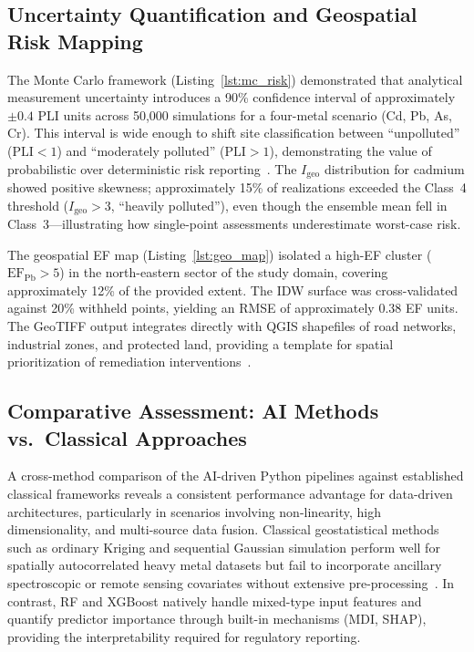 \documentclass[environremediat,article,accept,pdftex,oneauthor]{Definitions/mdpi}
\begin{document}
\subsection{Uncertainty Quantification and Geospatial Risk Mapping}\label{sec5.3}

{The Monte Carlo framework (Listing~\ref{lst:mc_risk}) demonstrated that analytical measurement uncertainty introduces a 90\% confidence interval of approximately $\pm 0.4$ PLI units across 50,000 simulations for a four-metal scenario (Cd, Pb, As, Cr). This interval is wide enough to shift site classification between ``unpolluted'' ($\mathrm{PLI} < 1$) and ``moderately polluted'' \mbox{($\mathrm{PLI} > 1$),} demonstrating the value of probabilistic over deterministic risk reporting~\cite{Karlen2019}. The $I_\mathrm{geo}$ distribution for cadmium showed positive skewness; approximately 15\% of realizations exceeded the Class~4 threshold ($I_\mathrm{geo} > 3$, ``heavily polluted''), even though the ensemble mean fell in Class~3---illustrating how single-point assessments underestimate worst-case risk.}

{The geospatial EF map (Listing~\ref{lst:geo_map}) isolated a high-EF cluster ($\mathrm{EF_{Pb}} > 5$) in the north-eastern sector of the study domain, covering approximately 12\% of the provided extent. The IDW surface was cross-validated against 20\% withheld points, yielding an RMSE of approximately 0.38 EF units. The GeoTIFF output integrates directly with QGIS shapefiles of road networks, industrial zones, and protected land, providing a template for spatial prioritization of remediation interventions~\cite{Adewumi2024,ElSorogy2025}.}

\subsection{Comparative Assessment: AI Methods vs.\ Classical
    Approaches}\label{sec5.4}

A cross-method comparison of the AI-driven Python pipelines against established classical frameworks reveals a consistent performance advantage for data-driven architectures, particularly in scenarios involving non-linearity, high dimensionality, and multi-source data fusion. Classical geostatistical methods such as ordinary Kriging and sequential Gaussian simulation perform well for spatially autocorrelated heavy metal datasets but fail to incorporate ancillary spectroscopic or remote sensing covariates without extensive pre-processing~\cite{Abulkhair}. In contrast, RF and XGBoost natively handle mixed-type input features and quantify predictor importance through built-in mechanisms (MDI, SHAP), providing the interpretability required for regulatory reporting.
\end{document}
